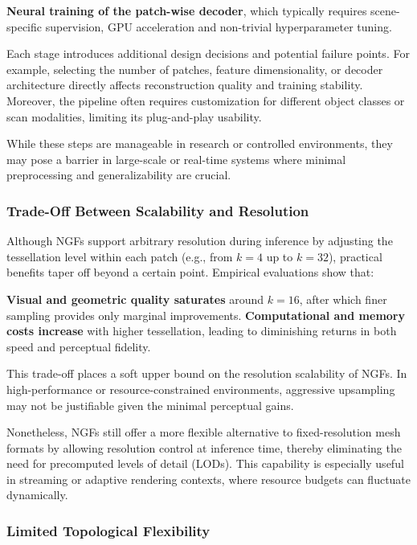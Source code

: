 \textbf{Neural training of the patch-wise decoder}, which typically requires scene-specific supervision, GPU acceleration and non-trivial hyperparameter tuning. 

Each stage introduces additional design decisions and potential failure points. 
For example, selecting the number of patches, feature dimensionality, or decoder architecture directly affects reconstruction quality and training stability. 
Moreover, the pipeline often requires customization for different object classes or scan modalities, limiting its plug-and-play usability. 

While these steps are manageable in research or controlled environments, they may pose a barrier in large-scale or real-time systems where minimal preprocessing and generalizability are crucial. 

\subsubsection{Trade-Off Between Scalability and Resolution}

Although NGFs support arbitrary resolution during inference by adjusting the tessellation level within each patch (e.g., from $k = 4$ up to $k = 32$), practical benefits taper off beyond a certain point. 
Empirical evaluations show that: 

\textbf{Visual and geometric quality saturates} around $k = 16$, after which finer sampling provides only marginal improvements. 
\textbf{Computational and memory costs increase} with higher tessellation, leading to diminishing returns in both speed and perceptual fidelity. 

This trade-off places a soft upper bound on the resolution scalability of NGFs. 
In high-performance or resource-constrained environments, aggressive upsampling may not be justifiable given the minimal perceptual gains. 

Nonetheless, NGFs still offer a more flexible alternative to fixed-resolution mesh formats by allowing resolution control at inference time, thereby eliminating the need for precomputed levels of detail (LODs). 
This capability is especially useful in streaming or adaptive rendering contexts, where resource budgets can fluctuate dynamically. 

\subsubsection{Limited Topological Flexibility}

